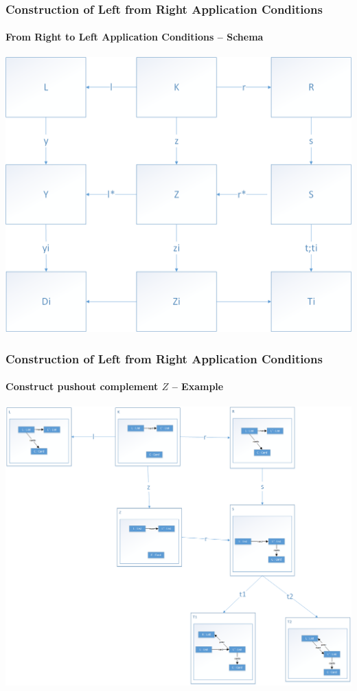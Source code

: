 \documentclass[32pt,t]{beamer}
\begin{document}
	\begin{frame}
		\frametitle{Construction of Left from Right Application Conditions}
		\framesubtitle{From Right to Left Application Conditions -- Schema}
		\centering
		\includegraphics[height=.8\textheight]{Images/50_RightAC-To-LeftAC_Schema}
	\end{frame}
	
	\begin{frame}
		\frametitle{Construction of Left from Right Application Conditions}
		\framesubtitle{Construct pushout complement $Z$ -- Example}
		\centering
		\includegraphics[height=.8\textheight]{Images/52_RightAC-To-LeftAC_Example_Step2}
	\end{frame}
\end{document}

